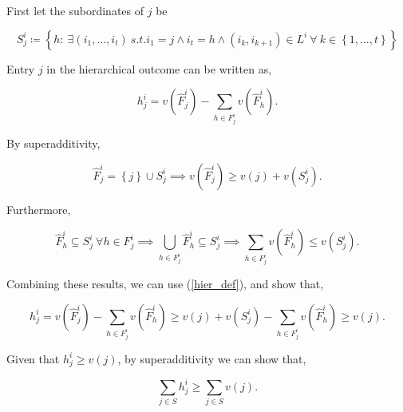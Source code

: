 \documentclass[american]{scrartcl}
\newcommand{\set}[1]{\left\{#1\right\}}
\begin{document}
First let the subordinates of $j$ be

\begin{equation}
    S^i_{j} \coloneqq \set{h: \ \exists (i_1, \dots, i_t) \ s.t. i_1 = j \land i_t = h \land (i_k, i_{k+1}) \in L^i \ \forall  \ k \in \set{1, \dots, t}}
\end{equation}

Entry $j$ in the hierarchical outcome can be written as,

\begin{equation} \label{hier_def}
    h^i_{j} = v(\hat{F}^i_j) - \sum_{h \in F^i_j}  v(\hat{F}^i_h).
\end{equation}

By superadditivity,

\begin{equation}
    \hat{F}^i_j = \set{j} \cup S^i_{j} \implies v(\hat{F}^i_j ) \geq v(j) + v(S^i_{j}).
\end{equation}

Furthermore,

\begin{equation}
    \hat{F}^i_h \subseteq S^i_{j} \ \forall h \in F^i_j \implies \bigcup_{h \in F^i_j} \hat{F}^i_h \subseteq S^i_{j} \implies \sum_{h \in F^i_j}  v(\hat{F}^i_h) \leq v(S^i_{j}).
\end{equation}

Combining these results, we can use (\ref{hier_def}), and show that,

\begin{equation}
    h^i_{j} = v(\hat{F}^i_j) - \sum_{h \in F^i_j}  v(\hat{F}^i_h) \geq v(j) + v(S^i_{j}) - \sum_{h \in F^i_j}  v(\hat{F}^i_h) \geq v(j).
\end{equation}

Given that $h^i_{j} \geq v(j)$, by superadditivity we can show that,

\begin{equation}
    \sum_{j \in S} h^i_{j} \geq \sum_{j \in S} v(j). %
\end{equation}
\end{document}
